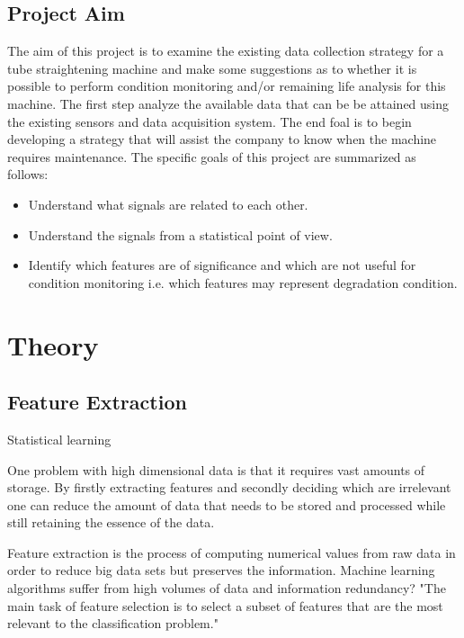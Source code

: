 \documentclass{article}
\begin{document}
\subsection{Project Aim}
The aim of this project is to examine the existing data collection strategy for a tube straightening machine and make some suggestions as to whether it is possible to perform condition monitoring and/or remaining life analysis for this machine. The first step analyze the available data that can be be attained using the existing sensors and data acquisition system. The end foal is to begin developing a strategy that will assist the company to know when the machine requires maintenance. The specific goals of this project are summarized as follows:
\begin{itemize}
\item Understand what signals are related to each other.
\item Understand the signals from a statistical point of view.
\item Identify which features are of significance and which are not useful for condition monitoring i.e. which features may represent degradation condition.
\end{itemize}
\clearpage  
\section{Theory}
\subsection{Feature Extraction}
Statistical learning 

One problem with high dimensional data is that it requires vast amounts of storage. By firstly extracting features and secondly deciding which are irrelevant one can reduce the amount of data that needs to be stored and processed while still retaining the essence of the data.

Feature extraction is the process of computing numerical values from raw data in order to reduce big data sets but preserves the information. Machine learning algorithms suffer from high volumes of data and information redundancy?
"The main task of feature selection is to select a subset of features that are the most relevant to the classification problem." ~\cite{ahmed2020condition}
\end{document}
